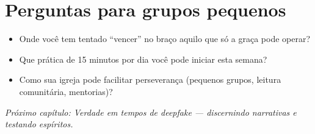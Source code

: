 \section{Perguntas para grupos pequenos}
\begin{itemize}[leftmargin=*,noitemsep]
  \item Onde você tem tentado “vencer” no braço aquilo que só a graça pode operar?
  \item Que prática de 15 minutos por dia você pode iniciar esta semana?
  \item Como sua igreja pode facilitar perseverança (pequenos grupos, leitura comunitária, mentorias)?
\end{itemize}

\bigskip
\noindent\textit{Próximo capítulo: Verdade em tempos de deepfake --- discernindo narrativas e testando espíritos.}
